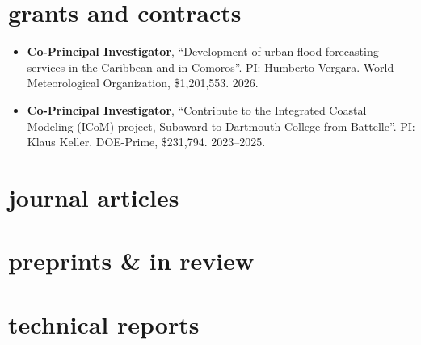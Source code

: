 \documentclass[10pt,oneside]{article}
\begin{document}

\section{grants and contracts}

\mbox{}\vspace{-\dimexpr\baselineskip\relax}

\begin{itemize}[label={}]
  
  \item \textbf{Co-Principal Investigator}, \enquote{Development of urban flood forecasting services in the Caribbean and in Comoros}.  PI: Humberto Vergara. {World Meteorological Organization}, \$1,201,553. 2026.
        
  \item \textbf{Co-Principal Investigator}, \enquote{Contribute to the Integrated Coastal Modeling (ICoM) project, Subaward to Dartmouth College from Battelle}.  PI: Klaus Keller. {DOE-Prime}, \$231,794. 2023--2025.
        
\end{itemize}


\section{journal articles}

\mbox{}\vspace{-\dimexpr\baselineskip\relax}
\vspace*{-1em}

\uspunctuation

\printbibliography[type=article, heading=none]

\section{preprints \& in review}

\mbox{}\vspace{-\dimexpr\baselineskip\relax}
\vspace*{-1em}
\printbibliography[type=unpublished, heading=none]

\section{technical reports}

\mbox{}\vspace{-\dimexpr\baselineskip\relax}
\vspace*{-1em}
\printbibliography[type=report, heading=none]
\end{document}
